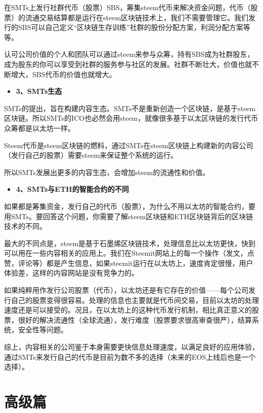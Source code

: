 \documentclass[]{ctexbook}
\providecommand{\tightlist}{%
  \setlength{\itemsep}{0pt}\setlength{\parskip}{0pt}}
\begin{document}
在SMTs上发行社群代币（股票）SBS，筹集steem代币来解决资金问题，代币（股票）的流通交易结算都是运行在steem区块链技术上，我们不需要管理它。我们发行的SBS可以自己定义``区块链生存训练''社群的股份分配方案，利润分配方案等等。

认可公司价值的个人和团队可以通过steem来参与众筹，持有SBS成为社群股东，成为股东的你可以享受到社群的服务参与社区的发展。社群不断壮大，价值也就不断增大，SBS代币的价值也就增大。

\begin{itemize}
\tightlist
\item
  \textbf{3、SMTs生态}
\end{itemize}

SMTs的提出，旨在构建内容生态。SMTs不是重新创造一个区块链，是基于steem区块链。所以SMTs的ICO也必然会用steem，就像很多基于以太区块链的发行代币众筹都是以太坊一样。

Steem代币是steem区块链的燃料，通过SMTs在steem区块链上构建新的内容公司（发行自己的股票）需要steem来保证整个系统的运行。

所以SMTs发展出更多的内容生态，会增加steem的流通性和价值。

\begin{itemize}
\tightlist
\item
  \textbf{4、SMTs与ETH的智能合约的不同}
\end{itemize}

如果都是筹集资金，发行自己的代币（股票），为什么不用以太坊的智能合约，要用SMTs。要回答这个问题，你需要了解steem区块链和ETH区块链背后的区块链技术的不同。

最大的不同点是，steem是基于石墨烯区块链技术，处理信息比以太坊更快，快到可以用在一些内容相关的应用上。我们在Steemit网站上的每一个操作（发文，点赞，评论等）都是产生信息，如果steemit运行在以太坊上，速度肯定很慢，用户体验差，这样的内容网站是没有竞争力的。

如果纯粹用作发行公司股票（代币），以太坊还是有它存在的价值------每个公司发行自己的股票变得很容易。处理的信息也主要就是代币间交易，目前以太坊的处理速度还是可以接受的。况且，在以太坊上的这种代币发行机制，相比真正意义的股票，很好的解决流通性（全球流通），发行难度（股票要求很高审查很严），结算系统，安全性等问题。

综上，内容相关的公司鉴于本身需要更快信息处理速度，以满足良好的应用体验，通过SMTs来发行自己的代币是目前为数不多的选择（未来的EOS上线后也是一个选择）。

\hypertarget{gjp}{%
\part{高级篇}\label{gjp}}
\end{document}
